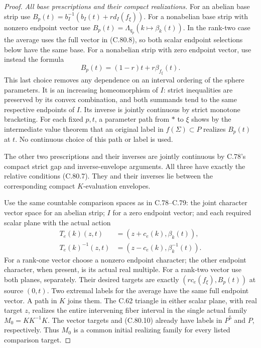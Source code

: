 \begin{proof}
\emph{All base prescriptions and their compact realizations.}
For an abelian base strip use
$B_p(t)=b_I^{-1}(b_I(t)+r d_I(f_\xi))$.
For a nonabelian base strip with nonzero
endpoint vector use
$B_p(t)=\Lambda_{q_p}(k\mapsto\beta_k(t))$.
In the rank-two case the average uses the
full vector in (C.80.8), so both scalar
endpoint selections below have the same base.
For a nonabelian strip with zero endpoint
vector, use instead the formula
\[
                  B_p(t)=(1-r)t+r\beta_{f_\xi}(t).
                                                               \tag{C.80.10}
\]
This last choice removes any dependence on
an interval ordering of the sphere parameters.
It is an increasing homeomorphism of $I$:
strict inequalities are preserved by its
convex combination, and both summands tend
to the same respective endpoints of $I$.
Its inverse is jointly continuous by strict
monotone bracketing. For each fixed $p,t$,
a parameter path from $*$ to $\xi$ shows by
the intermediate value theorem that an
original label in $f(\Sigma)\subset P$
realizes $B_p(t)$ at $t$. No continuous
choice of this path or label is used.

The other two prescriptions and their inverses
are jointly continuous by C.78's compact strict
gap and inverse-envelope arguments. All three
have exactly the relative conditions (C.80.7).
They and their inverses lie between the
corresponding compact $K$-evaluation envelopes.

Use the same countable comparison spaces as
in C.78--C.79: the joint character vector
space for an abelian strip; $I$ for a zero
endpoint vector; and each required scalar
plane with the actual action
\[
 \begin{split}
 T_e(k)(z,t)&=(z+c_e(k),\beta_k(t)),\\
 T_e(k)^{-1}(z,t)&=(z-c_e(k),\beta_k^{-1}(t)).
 \end{split}
                                                               \tag{C.80.11}
\]
For a rank-one vector choose a nonzero endpoint
character; the other endpoint character, when
present, is its actual real multiple. For a
rank-two vector use both planes, separately.
Their desired targets are exactly
$(r c_e(f_\xi),B_p(t))$ at source $(0,t)$.
Two extremal labels for the average have
the same full endpoint vector. A path in
$K$ joins them. The C.62 triangle in either
scalar plane, with real target $z$, realizes
the entire intervening fiber interval in
the single actual family $M_0=K K^{-1}K$.
The vector targets and (C.80.10) already
have labels in $P^5$ and $P$, respectively.
Thus $M_0$ is a common initial realizing
family for every listed comparison target.


\end{proof}
